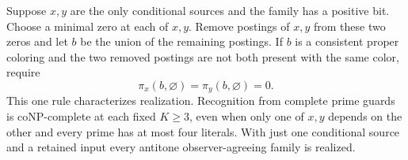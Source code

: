 \begin{corollary}
\label{core:cor:two-conditional-guard-complexity}
Suppose $x,y$ are the only conditional sources and the family has
a positive bit. Choose a minimal zero at each of $x,y$. Remove
postings of $x,y$ from these two zeros and let $b$ be the union
of the remaining postings. If $b$ is a consistent proper coloring
and the two removed postings are not both present with the same
color, require
\[
                  \pi_x(b,\varnothing)=\pi_y(b,\varnothing)=0 .
\]
This one rule characterizes realization. Recognition from complete
prime guards is coNP-complete at each fixed $K\ge3$, even when
only one of $x,y$ depends on the other and every prime has at most
four literals. With just one conditional source and a retained
input every antitone observer-agreeing family is realized.
\end{corollary}

